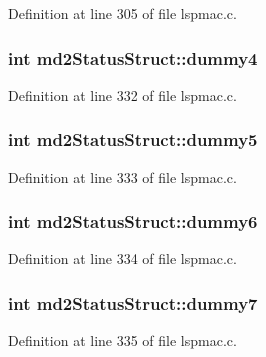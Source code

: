 Definition at line 305 of file lspmac.\-c.

\hypertarget{structmd2StatusStruct_adaa01db9cf77d95756bc3156fb702600}{
\subsubsection[{dummy4}]{\setlength{\rightskip}{0pt plus 5cm}int md2\-Status\-Struct\-::dummy4}}\label{structmd2StatusStruct_adaa01db9cf77d95756bc3156fb702600}


Definition at line 332 of file lspmac.\-c.

\hypertarget{structmd2StatusStruct_af4f8869f8954c6162cae80000c54694f}{
\subsubsection[{dummy5}]{\setlength{\rightskip}{0pt plus 5cm}int md2\-Status\-Struct\-::dummy5}}\label{structmd2StatusStruct_af4f8869f8954c6162cae80000c54694f}


Definition at line 333 of file lspmac.\-c.

\hypertarget{structmd2StatusStruct_a864a2234ede061ec2380230ebf29ce70}{
\subsubsection[{dummy6}]{\setlength{\rightskip}{0pt plus 5cm}int md2\-Status\-Struct\-::dummy6}}\label{structmd2StatusStruct_a864a2234ede061ec2380230ebf29ce70}


Definition at line 334 of file lspmac.\-c.

\hypertarget{structmd2StatusStruct_a91f38d814222edeffa67a6a3ab61f5d6}{
\subsubsection[{dummy7}]{\setlength{\rightskip}{0pt plus 5cm}int md2\-Status\-Struct\-::dummy7}}\label{structmd2StatusStruct_a91f38d814222edeffa67a6a3ab61f5d6}


Definition at line 335 of file lspmac.\-c.

